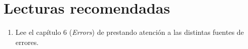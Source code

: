 \section{Lecturas recomendadas}

\begin{enumerate}

\item Lee el capítulo 6 (\emph{Errors}) 
      de \pppbook{}
      prestando atención a las distintas fuentes de errores.

\end{enumerate}
